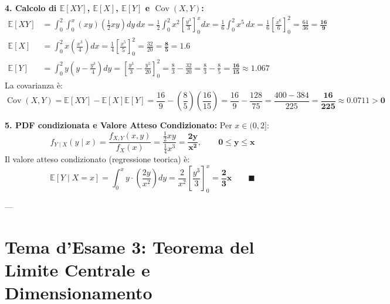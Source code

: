 \begin{dimostrazione}
\textbf{4. Calcolo di $\mathbb{E}[XY]$, $\mathbb{E}[X]$, $\mathbb{E}[Y]$ e $\operatorname{Cov}(X,Y)$:}
\begin{align*}
    \mathbb{E}[XY] &= \int_0^2 \int_0^x (x y) \left(\frac{1}{2} x y\right) dy \, dx = \frac{1}{2} \int_0^2 x^2 \left[ \frac{y^3}{3} \right]_0^x dx = \frac{1}{6} \int_0^2 x^5 \, dx = \frac{1}{6} \left[ \frac{x^6}{6} \right]_0^2 = \frac{64}{36} = \bm{\frac{16}{9}} \\
    \mathbb{E}[X] &= \int_0^2 x \left(\frac{x^3}{4}\right) dx = \frac{1}{4} \left[ \frac{x^5}{5} \right]_0^2 = \frac{32}{20} = \bm{\frac{8}{5}} = 1.6 \\
    \mathbb{E}[Y] &= \int_0^2 y \left(y - \frac{y^3}{4}\right) dy = \left[ \frac{y^3}{3} - \frac{y^5}{20} \right]_0^2 = \frac{8}{3} - \frac{32}{20} = \frac{8}{3} - \frac{8}{5} = \bm{\frac{16}{15}} \approx 1.067
\end{align*}
La covarianza è:
\begin{equation*}
    \operatorname{Cov}(X, Y) = \mathbb{E}[XY] - \mathbb{E}[X]\mathbb{E}[Y] = \frac{16}{9} - \left(\frac{8}{5}\right)\left(\frac{16}{15}\right) = \frac{16}{9} - \frac{128}{75} = \frac{400 - 384}{225} = \bm{\frac{16}{225} \approx 0.0711 > 0}
\end{equation*}

\textbf{5. PDF condizionata e Valore Atteso Condizionato:}
Per $x \in (0, 2]$:
\begin{equation*}
    f_{Y \mid X}(y \mid x) = \frac{f_{X,Y}(x, y)}{f_X(x)} = \frac{\frac{1}{2} x y}{\frac{1}{4} x^3} = \bm{\frac{2y}{x^2}, \qquad 0 \le y \le x}
\end{equation*}
Il valore atteso condizionato (regressione teorica) è:
\begin{equation*}
    \mathbb{E}[Y \mid X = x] = \int_0^x y \cdot \left(\frac{2y}{x^2}\right) dy = \frac{2}{x^2} \left[ \frac{y^3}{3} \right]_0^x = \bm{\frac{2}{3} x} \qquad \blacksquare
\end{equation*}
\end{dimostrazione}

---

\section{Tema d'Esame 3: Teorema del Limite Centrale e Dimensionamento}

